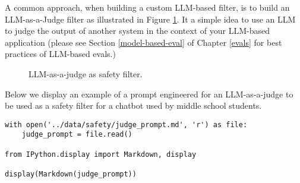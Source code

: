 A common approach, when building a custom LLM-based filter, is to build an LLM-as-a-Judge filter as illustrated in Figure \ref{judge_safety}. It a simple idea to use an LLM to judge the output of another system in the context of your LLM-based application (please see Section \ref{model-based-eval} of Chapter \ref{evals} for best practices of LLM-based evals.)

\begin{figure}[H]
\centering

\caption{LLM-as-a-judge as safety filter.}
\label{judge_safety}
\end{figure}

Below we display an example of a prompt engineered for an LLM-as-a-judge to be used as a safety filter for a chatbot used by middle school students.

\begin{verbatim}
with open('../data/safety/judge_prompt.md', 'r') as file:
    judge_prompt = file.read()

from IPython.display import Markdown, display

display(Markdown(judge_prompt))
\end{verbatim}


